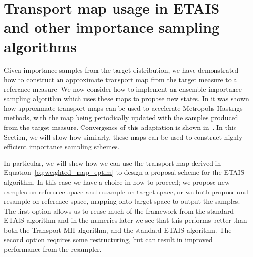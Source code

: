 \documentclass[final]{siamltex}
\begin{document}
\section[Transport map MCMC]{Transport map usage in ETAIS
  and other importance sampling algorithms}\label{sec:TETAIS}

Given importance samples from the target distribution, we have demonstrated how to construct an approximate transport map from the
target measure to a reference measure. We now consider how to
implement an ensemble importance sampling algorithm which uses
these maps to propose new states. In \cite{parno2018transport} it was
shown how approximate transport maps can be used to accelerate
Metropolis-Hastings methods, with the map being periodically updated
with the samples produced from the target measure. Convergence of this
adaptation is shown in~\cite{parno2018transport}. In this Section, we
will show how similarly, these maps can be used to construct highly
efficient importance sampling schemes.

In particular, we will show how we can use the transport map derived in Equation~\eqref{eq:weighted_map_optim} to
design a proposal scheme for the ETAIS algorithm. In this case we have a choice in how to proceed; we
propose new samples on reference space and resample on target space, or we both propose and resample on reference space, mapping onto target space to output the samples. The first option allows us to reuse much of the framework
from the standard ETAIS algorithm and in the numerics later we see that this performs better than
both the Transport MH algorithm, and the standard ETAIS algorithm. The second option requires some
restructuring, but can result in improved performance from the resampler.

\end{document}
